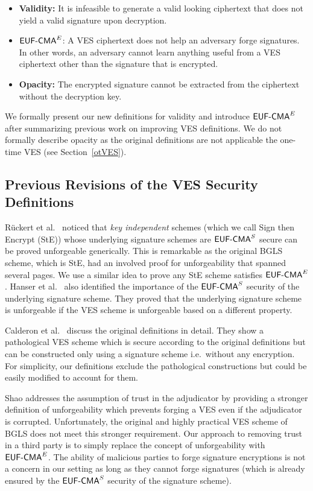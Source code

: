 \begin{itemize}
    \item \textbf{Validity:} It is infeasible to generate a valid looking ciphertext that does not yield a valid signature upon decryption.
    \item $\textsf{EUF-CMA}^E$: A VES ciphertext does not help an adversary forge signatures. In other words, an adversary cannot learn anything useful from a VES ciphertext other than the signature that is encrypted.
    \item \textbf{Opacity:} The encrypted signature cannot be extracted from the ciphertext without the decryption key.
\end{itemize}


We formally present our new definitions for validity and introduce $\textsf{EUF-CMA}^E$ after summarizing previous work on improving VES definitions. We do not formally describe opacity as the original definitions are not applicable the one-time VES (see Section~\ref{otVES}).

\subsection{Previous Revisions of the VES Security Definitions}

Rückert et al.\ \cite{Ruckert:2009:SVE:1615384.1615387} noticed that \emph{key independent} schemes (which we call Sign then Encrypt (StE)) whose underlying signature schemes are $\textsf{EUF-CMA}^S$ secure can be proved unforgeable generically.
This is remarkable as the original BGLS scheme, which is StE, had an involved proof for unforgeability that spanned several pages.
We use a similar idea to prove any StE scheme satisfies $\textsf{EUF-CMA}^E$.
Hanser et al.\ \cite{VES-structure-preserving} also identified the importance of the $\textsf{EUF-CMA}^S$ security of the underlying signature scheme.
They proved that the underlying signature scheme is unforgeable if the VES scheme is unforgeable based on a different property.

Calderon et al.\ \cite{calderon2014rethinking} discuss the original definitions in detail.
They show a pathological VES scheme which is secure according to the original definitions but can be constructed only using a signature scheme i.e.\ without any encryption.
For simplicity, our definitions exclude the pathological constructions but could be easily modified to account for them.

Shao \cite{SHAO20081961} addresses the assumption of trust in the adjudicator by providing a stronger definition of unforgeability which prevents forging a VES even if the adjudicator is corrupted.
Unfortunately, the original and highly practical VES scheme of BGLS does not meet this stronger requirement.
Our approach to removing trust in a third party is to simply replace the concept of unforgeability with $\textsf{EUF-CMA}^E$.
The ability of malicious parties to forge signature encryptions is not a concern in our setting as long as they cannot forge signatures (which is already ensured by the $\textsf{EUF-CMA}^S$ security of the signature scheme).


